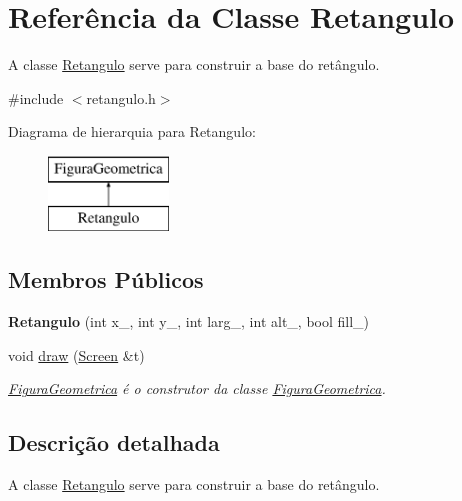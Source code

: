 \hypertarget{class_retangulo}{}\section{Referência da Classe Retangulo}
\label{class_retangulo}


A classe \mbox{\hyperlink{class_retangulo}{Retangulo}} serve para construir a base do retângulo.  




{\ttfamily \#include $<$retangulo.\+h$>$}

Diagrama de hierarquia para Retangulo\+:\begin{figure}[H]
\begin{center}
\leavevmode
\includegraphics[height=2.000000cm]{class_retangulo}
\end{center}
\end{figure}
\subsection*{Membros Públicos}
\begin{DoxyCompactItemize}
\item 
\mbox{\label{class_retangulo_aacd2438d0f0a119c5a9358c3da7c9eee}} 
{\bfseries Retangulo} (int x\+\_\+, int y\+\_\+, int larg\+\_\+, int alt\+\_\+, bool fill\+\_\+)
\item 
void \mbox{\hyperlink{class_retangulo_ac088dd6d3f4f3d3f80363a868c2e74f1}{draw}} (\mbox{\hyperlink{class_screen}{Screen}} \&t)
\begin{DoxyCompactList}\small\item\em \mbox{\hyperlink{class_figura_geometrica}{Figura\+Geometrica}} é o construtor da classe \mbox{\hyperlink{class_figura_geometrica}{Figura\+Geometrica}}. \end{DoxyCompactList}\end{DoxyCompactItemize}


\subsection{Descrição detalhada}
A classe \mbox{\hyperlink{class_retangulo}{Retangulo}} serve para construir a base do retângulo. 

